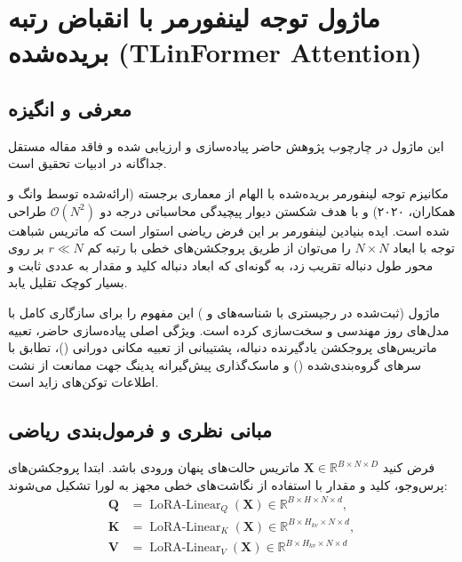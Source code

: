 \section{ماژول توجه لینفورمر با انقباض رتبه بریده‌شده (TLinFormer Attention)}
\label{sec:module_tlinformer_attention}

\subsection{معرفی و انگیزه}
این ماژول در چارچوب پژوهش حاضر پیاده‌سازی و ارزیابی شده و فاقد مقاله مستقل جداگانه در ادبیات تحقیق است.

مکانیزم توجه لینفورمر بریده‌شده  با الهام از معماری برجسته  (ارائه‌شده توسط وانگ و همکاران، ۲۰۲۰) و با هدف شکستن دیوار پیچیدگی محاسباتی درجه دو $\mathcal{O}(N^2)$ طراحی شده است. ایده بنیادین لینفورمر بر این فرض ریاضی استوار است که ماتریس شباهت توجه با ابعاد $N \times N$ را می‌توان از طریق پروجکشن‌های خطی با رتبه کم $r \ll N$ بر روی محور طول دنباله تقریب زد، به گونه‌ای که ابعاد دنباله کلید و مقدار به عددی ثابت و بسیار کوچک تقلیل یابد.

ماژول  (ثبت‌شده در رجیستری با شناسه‌های  و ) این مفهوم را برای سازگاری کامل با مدل‌های روز مهندسی و سخت‌سازی کرده است. ویژگی اصلی پیاده‌سازی حاضر، تعبیه ماتریس‌های پروجکشن یادگیرنده دنباله، پشتیبانی از تعبیه مکانی دورانی ()، تطابق با سرهای گروه‌بندی‌شده () و ماسک‌گذاری پیش‌گیرانه پدینگ جهت ممانعت از نشت اطلاعات توکن‌های زاید است.

\subsection{مبانی نظری و فرمول‌بندی ریاضی}
فرض کنید $\mathbf{X} \in \mathbb{R}^{B \times N \times D}$ ماتریس حالت‌های پنهان ورودی باشد. ابتدا پروجکشن‌های پرس‌وجو، کلید و مقدار با استفاده از نگاشت‌های خطی مجهز به لورا تشکیل می‌شوند:
\begin{align}
\mathbf{Q} &= \operatorname{LoRA-Linear}_Q(\mathbf{X}) \in \mathbb{R}^{B \times H \times N \times d}, \\
\mathbf{K} &= \operatorname{LoRA-Linear}_K(\mathbf{X}) \in \mathbb{R}^{B \times H_{kv} \times N \times d}, \\
\mathbf{V} &= \operatorname{LoRA-Linear}_V(\mathbf{X}) \in \mathbb{R}^{B \times H_{kv} \times N \times d}
\end{align}

